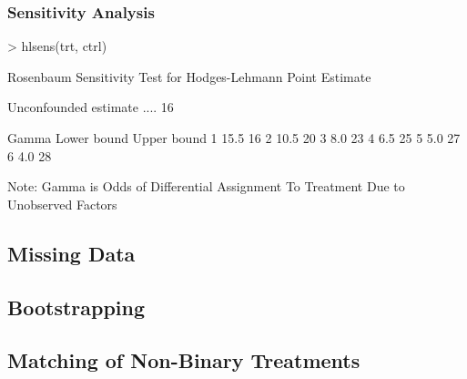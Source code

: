 \documentclass[10pt,slidestop,mathserif,c]{beamer}
\begin{document}
\begin{frame}
    \frametitle{Sensitivity Analysis}
\begin{Schunk}
\begin{Sinput}
> hlsens(trt, ctrl)
\end{Sinput}
\begin{Soutput}
 Rosenbaum Sensitivity Test for Hodges-Lehmann Point Estimate 
 
Unconfounded estimate ....  16 

 Gamma Lower bound Upper bound
     1        15.5          16
     2        10.5          20
     3         8.0          23
     4         6.5          25
     5         5.0          27
     6         4.0          28

 Note: Gamma is Odds of Differential Assignment To
 Treatment Due to Unobserved Factors 
\end{Soutput}
\end{Schunk}
\end{frame}




\subsection{Missing Data}


\subsection{Bootstrapping}


\subsection{Matching of Non-Binary Treatments}
\end{document}
